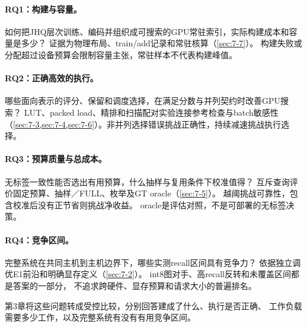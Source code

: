 \paragraph{RQ1：构建与容量。}
如何把JHQ层次训练、编码并组织成可搜索的GPU常驻索引，实际构建成本和容量是多少？
证据为物理布局、train/add记录和常驻核算（\cref{sec:7-7}）。
构建失败或分配超过设备预算会限制容量主张，常驻样本不代表构建峰值。

\paragraph{RQ2：正确高效的执行。}
哪些面向表示的评分、保留和调度选择，在满足分数与并列契约时改善GPU搜索？
LUT、packed load、精排和扫描配对实验连接参考检查与batch敏感性
（\cref{sec:7-3,sec:7-4,sec:7-6}）。非并列选择错误挑战正确性，持续减速挑战执行选择。

\paragraph{RQ3：预算质量与总成本。}
无标签一致性能否选出有用预算，什么抽样与复用条件下校准值得？
互斥查询评价固定预算、抽样／FULL、枚举及GT oracle（\cref{sec:7-5}）。
越阈挑战可靠性，包含校准后没有正节省则挑战净收益。
oracle是评估对照，不是可部署的无标签决策。

\paragraph{RQ4：竞争区间。}
完整系统在共同主机到主机边界下，哪些实测recall区间具有竞争力？
依据独立调优E1前沿和明确显存定义（\cref{sec:7-2}）。
int8图对手、高recall反转和未覆盖区间都是答案的一部分，
不追求跨硬件、显存预算和请求大小的普遍排名。

第3章将这些问题转成受控比较，分别回答建成了什么、执行是否正确、
工作负载需要多少工作，以及完整系统有没有有用竞争区间。
